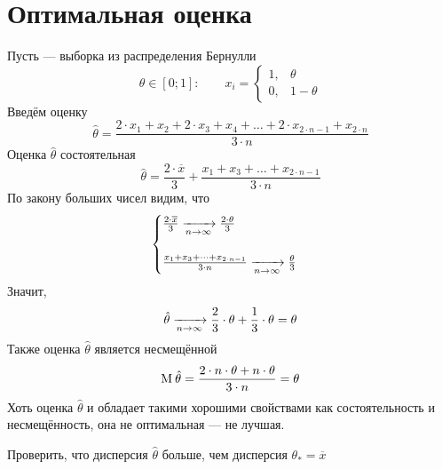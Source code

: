 \section{Оптимальная оценка}
\begin{example}\label{example:optimalEstimate}
  Пусть \xsample[2 \cdot n] --- выборка из распределения Бернулли
  \begin{equation*}
    \theta \in \left[ 0; 1 \right]:\qquad
    x_i = \begin{cases}
      1,& \theta \\
      0,& 1 - \theta
    \end{cases}
  \end{equation*}
  Введём оценку
  \begin{equation*}
    \hat{\theta}
    = \frac{2 \cdot x_1 + x_2 + 2 \cdot x_3 + x_4 + \dots
      + 2 \cdot x_{2 \cdot n - 1} + x_{2 \cdot n}}{3 \cdot n}
  \end{equation*}
  Оценка $\hat{\theta}$ состоятельная
  \begin{equation*}
    \hat{\theta}
    = \frac{2 \cdot \overline{x}}{3}
      + \frac{x_1 + x_3 + \dots + x_{2 \cdot n - 1}}{3 \cdot n}
  \end{equation*}
  По закону больших чисел видим, что
  \begin{equation*}
    \begin{cases}
      \frac{2 \cdot \overline{x}}{3} 
        \covergence{} \frac{2 \cdot \theta}{3} \\ \\ %
      \frac{x_1 + x_3 + \dots + x_{2 \cdot n - 1}}{3 \cdot n}
        \covergence{} \frac{\theta}{3}
    \end{cases}
  \end{equation*}
  Значит,
  \begin{equation*}
    \hat{\theta}
    \xrightarrow[n\to\infty]{} \frac{2}{3} \cdot \theta + \frac{1}{3} \cdot \theta
    = \theta
  \end{equation*}
  Также оценка $\hat{\theta}$ является несмещённой
  \begin{equation*}
    \operatorname{M}_{} \hat{\theta}
    = \frac{2 \cdot n \cdot \theta + n \cdot \theta}{3 \cdot n}
    = \theta
  \end{equation*}
  Хоть оценка $\hat{\theta}$ и обладает такими хорошими свойствами как
  состоятельность и несмещённость, она не оптимальная --- не лучшая.
\end{example}

\begin{exercise}
  Проверить, что дисперсия $\hat{\theta}$ больше, чем дисперсия
  $\theta_* = \overline{x}$
\end{exercise}

